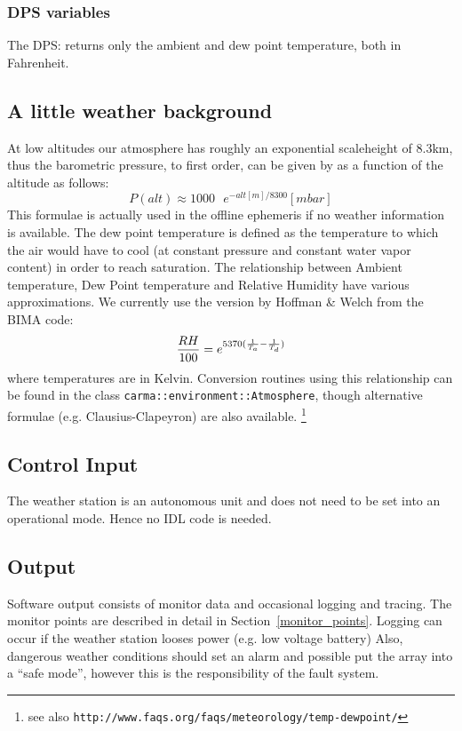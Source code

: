 \documentclass[11pt]{article}
\begin{document}
\subsubsection{DPS variables}

The DPS: returns only the ambient and dew point temperature, both in Fahrenheit.


\subsection{A little weather background}

At low altitudes our atmosphere has roughly an exponential scaleheight 
of 8.3km, thus the barometric pressure, to first order, can be given by
as a function of the altitude as follows:
$$
     P(alt) \approx 1000  ~~~ e^{-alt[m]/8300}  [mbar]
$$
This formulae is actually used in the offline ephemeris if no weather
information is available.
\smallskip
The dew point temperature is defined as the temperature to which the air
would have to cool (at constant pressure and constant water vapor
content) in order to reach saturation. 
\smallskip
The relationship between Ambient temperature, Dew Point temperature and
Relative Humidity have various approximations. We currently use the
version by Hoffman \& Welch from the BIMA code:
$$
        {RH \over 100 }= e^{    5370 ({1\over T_a} - {1\over T_d}) }
$$
where temperatures are in Kelvin. Conversion routines using this relationship
can be found in the class
{\tt carma::environment::Atmosphere}, though alternative formulae
(e.g. Clausius-Clapeyron) are also available.
\footnote{see also {\tt http://www.faqs.org/faqs/meteorology/temp-dewpoint/}}

\subsection{Control Input}

The weather station is an autonomous unit and does not need to be
set into an operational mode. Hence no IDL code is needed.

\subsection{Output}

Software output consists of monitor data and occasional logging and tracing.
The monitor points are described in detail in Section~\ref{monitor_points}.
Logging can occur if the weather station looses power (e.g. low voltage battery)
Also, dangerous weather conditions should set an alarm and possible put the
array into a ``safe mode'', however this is the responsibility of the fault
system.
\end{document}
